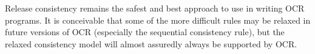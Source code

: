Release consistency remains the safest and best approach to use in
writing OCR programs. It is conceivable that some of the more
difficult rules may be relaxed in future versions of OCR (especially
the sequential consistency rule), but the relaxed consistency model
will almost assuredly always be supported by OCR.
%
%

